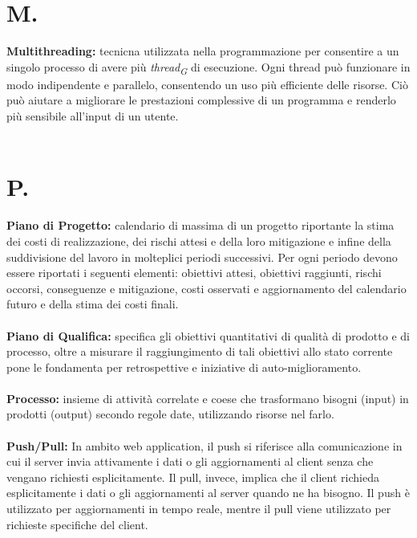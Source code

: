 \documentclass[a4paper, 12pt]{article}
\begin{document}
\newpage
\section*{M.}
\textbf{Multithreading:} tecnicna utilizzata nella programmazione per consentire a un singolo processo di avere più \textit{thread\textsubscript{G}} di esecuzione. Ogni thread può funzionare in modo indipendente e parallelo, consentendo un uso più efficiente delle risorse. Ciò può aiutare a migliorare le prestazioni complessive di un programma e renderlo più sensibile all'input di un utente. \\ \\

\newpage
\section*{P.}
\textbf{Piano di Progetto:} calendario di massima di un progetto riportante la stima dei costi di realizzazione, dei rischi attesi e della loro mitigazione e infine della suddivisione del lavoro in molteplici periodi successivi. Per ogni periodo devono essere riportati i seguenti elementi: obiettivi attesi, obiettivi raggiunti, rischi occorsi, conseguenze e mitigazione, costi osservati e aggiornamento del calendario futuro e della stima dei costi finali. \\ \\
\textbf{Piano di Qualifica:} specifica gli obiettivi quantitativi di qualità di prodotto e di processo, oltre a misurare il raggiungimento di tali obiettivi allo stato corrente pone le fondamenta per retrospettive e iniziative di auto-miglioramento. \\ \\
\textbf{Processo:} insieme di attività correlate e coese che trasformano bisogni (input) in prodotti (output) secondo regole date, utilizzando risorse nel farlo. \\ \\
\textbf{Push/Pull:} In ambito web application, il push si riferisce alla comunicazione in cui il server invia attivamente i dati o gli aggiornamenti al client senza che vengano richiesti esplicitamente. Il pull, invece, implica che il client richieda esplicitamente i dati o gli aggiornamenti al server quando ne ha bisogno. Il push è utilizzato per aggiornamenti in tempo reale, mentre il pull viene utilizzato per richieste specifiche del client. \\ \\
\end{document}

